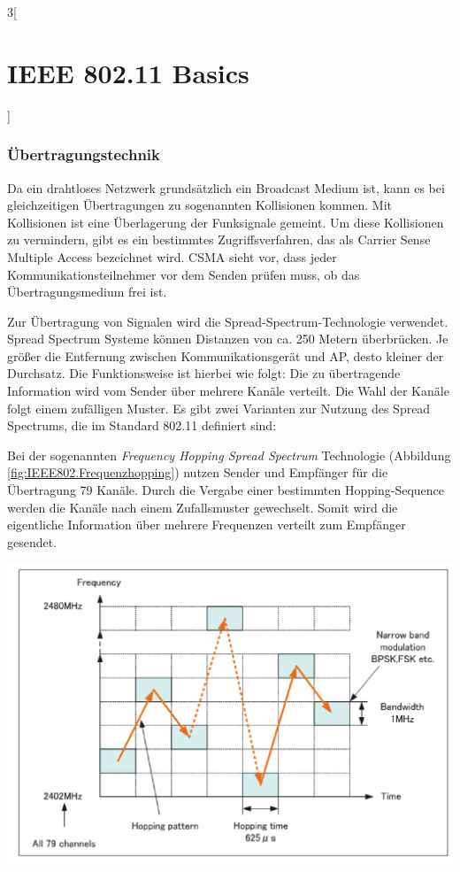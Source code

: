 \begin{multicols}{3}[\section{IEEE 802.11 Basics}]
\subsubsection*{Übertragungstechnik}
Da ein drahtloses Netzwerk grundsätzlich ein Broadcast Medium ist, kann es bei gleichzeitigen Übertragungen zu sogenannten Kollisionen kommen. Mit Kollisionen ist eine Überlagerung der Funksignale gemeint. Um diese Kollisionen zu vermindern, gibt es ein bestimmtes Zugriffsverfahren, das als Carrier Sense Multiple Access bezeichnet wird. CSMA sieht vor, dass jeder Kommunikationsteilnehmer vor dem Senden prüfen muss, ob das Übertragungsmedium frei ist. 

Zur Übertragung von Signalen wird die Spread-Spectrum-Technologie verwendet. Spread Spectrum Systeme können Distanzen von ca. 250 Metern überbrücken. Je größer die Entfernung zwischen Kommunikationsgerät und AP, desto kleiner der Durchsatz. Die Funktionsweise ist hierbei wie folgt: Die zu übertragende Information wird vom Sender über mehrere Kanäle verteilt. Die Wahl der Kanäle folgt einem zufälligen Muster. Es gibt zwei Varianten zur Nutzung des Spread Spectrums, die im Standard 802.11 definiert sind:

Bei der sogenannten \textit{Frequency Hopping Spread Spectrum} Technologie (Abbildung  \ref{fig:IEEE802.Frequenzhopping}) nutzen
Sender und Empfänger für die Übertragung 79 Kanäle. Durch die Vergabe einer bestimmten Hopping-Sequence werden die Kanäle nach einem Zufallsmuster gewechselt. Somit wird die eigentliche Information über mehrere Frequenzen verteilt zum Empfänger gesendet. 
\begin{Figure}
\includegraphics[width=\linewidth]{Kapitel/IEEE802.11/Grafiken/Frequenzhopping.png}
\label{fig:IEEE802.Frequenzhopping}
\end{Figure}


\end{multicols}
